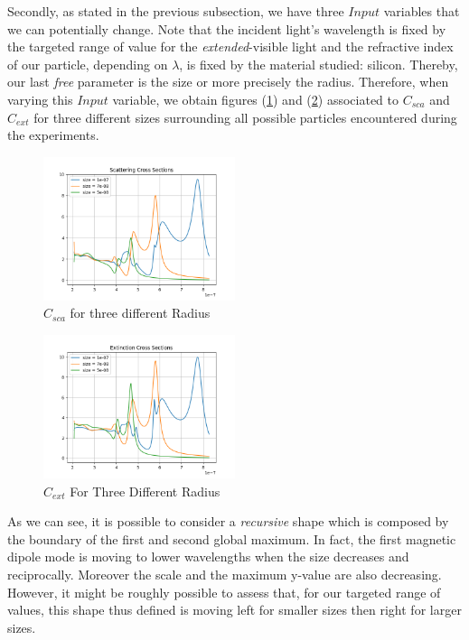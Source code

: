 \documentclass{article}
\numberwithin{equation}{section}
\begin{document}
Secondly, as stated in the previous subsection, we have three $Input$ variables that we can potentially change. Note that the incident light's wavelength is fixed by the targeted range of value for the \textit{extended}-visible light and the refractive index of our particle, depending on $\lambda$, is fixed by the material studied: silicon. Thereby, our last \textit{free} parameter is the size or more precisely the radius. Therefore, when varying this $Input$ variable, we obtain figures (\ref{fig:sca_var}) and (\ref{fig:ext_var}) associated to $C_{sca}$ and $C_{ext}$ for three different sizes surrounding all possible particles encountered during the experiments.
\begin{figure}[h!]
    \centering
    \includegraphics[width=0.5\textwidth, height=0.4\textwidth]{sca_var.png}
    \caption{$C_{sca}$ for three different Radius}
    \label{fig:sca_var}
\end{figure}
\begin{figure}[h!]
    \centering
    \includegraphics[width=0.5\textwidth, height=0.4\textwidth]{ext_var.png}
    \caption{$C_{ext}$ For Three Different Radius}
    \label{fig:ext_var}
\end{figure}
As we can see, it is possible to consider a \textit{recursive} shape which is composed by the boundary of the first and second global maximum. In fact, the first magnetic dipole mode is moving to lower wavelengths when the size decreases and reciprocally. Moreover the scale and the maximum y-value are also decreasing. However, it might be roughly possible to assess that, for our targeted range of values, this shape thus defined is moving left for smaller sizes then right for larger sizes.
\end{document}

